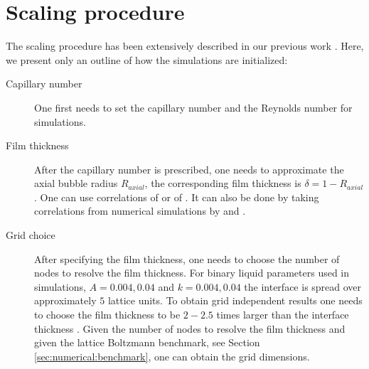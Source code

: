 \documentclass[preprint,12pt]{elsarticle}
\begin{document}
\section{Scaling procedure}
\label{append:scaling}
The scaling procedure has been extensively  described in our previous work \cite{kuzmin-binary2d}.
Here, we present
only an outline of how the simulations are initialized:
\begin{description}
 \item[Capillary number] One first needs to set the capillary number and the Reynolds number for
simulations. 
 \item[Film thickness] After the capillary number is prescribed, one needs to approximate the axial
bubble radius $R_{axial}$, the corresponding film thickness is $\delta=1-R_{axial}$. One can use
correlations of \citet{shikazono-square} or of \citet{kreutzer-taylor}. It can also be done by
taking correlations from numerical simulations by
\citet{heil-bretherton} and \citet{giavedoni-numerical}.  
\item[Grid choice] After specifying the film thickness, one needs to choose the
number of nodes to resolve the film thickness. For binary liquid parameters used in simulations,
$A=0.004,0.04$ and $k=0.004,0.04$ the
interface is spread over approximately $5$ lattice units. To obtain grid independent results one
needs to choose the
film thickness to be $2-2.5$ times larger than the interface thickness \cite{kuzmin-binary2d}.
Given the number of nodes to resolve the film thickness and given the lattice Boltzmann
benchmark, see Section \ref{sec:numerical:benchmark}, one can obtain the grid dimensions.


\end{description}
\end{document}
